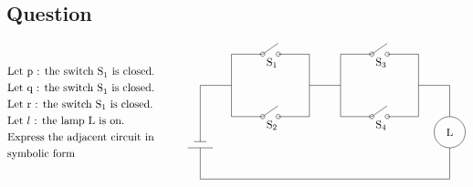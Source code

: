 \documentclass[17pt]{extarticle}
\begin{document}
\begin{fleqn}
\section{Question}

\begin{equation} \nonumber
\begin{alignedat}{4}
& \text{Let p : the switch S}_1 \text{ is closed.} \\
& \text{Let q : the switch S}_1 \text{ is closed.} \\
& \text{Let r : the switch S}_1 \text{ is closed.} \\
& \text{Let }l \text{ : the lamp L is on.}\\
& \text{Express the adjacent circuit in} \\
& \text{symbolic form} \\
\end{alignedat}
\quad\quad\quad
\begin{alignedat}{4}
\begin{tikzpicture}[dot/.style={circle,inner sep=1.4pt,draw}]

\draw (0,3) -- (1,3) -- (1,4) -- (2,4);
\node [dot] at (2,4) {};
\node [dot] at (2.5,4) {};
\draw (2,4) -- +(35:0.60);
\node at ( 2.3,4)[below]{S$_1$};


\draw (2.5,4)--(3.5,4) -- (3.5,2)--(2.5,2);
\node [dot] at (2.5,2) {};
\node [dot] at (2,2) {};
\draw (2,2) -- +(35:0.60);
\node at ( 2.3,2)[below]{S$_2$};

\draw (2,2) -- (1,2) -- (1,3);

\draw (3.5,3) -- (4.5,3) -- (4.5,4) --(5.5,4);

\node [dot] at (5.5,4) {};
\draw (5.5,4) -- +(35:0.60);
\node [dot] at (6,4) {};
\node at (5.8,4)[below]{S$_3$};

\draw (6,4)--(7,4) -- (7,2)--(6,2);
\node [dot] at (6,2) {};
\node [dot] at (5.5,2) {};
\draw (5.5,2) -- +(35:0.60);
\node at ( 5.8,2)[below]{S$_4$};

\draw (5.5,2) -- (4.5,2) -- (4.5,3);
\draw (7,3) -- (8,3)--(8,2);
\draw (8,1.5) circle(0.5);
\draw (8,1.5)node {L};
\draw (8,1)--(8,0)--(0,0)--(0,1);
\draw (-0.4,1)--(0.4,1);
\draw (-0.2,1.2)--(0.2,1.2);
\draw (0,1.2)--(0,3);
\end{tikzpicture}
\end{alignedat}
\end{equation}
\quad
\vspace*{-5mm}


\end{fleqn}
\end{document}
